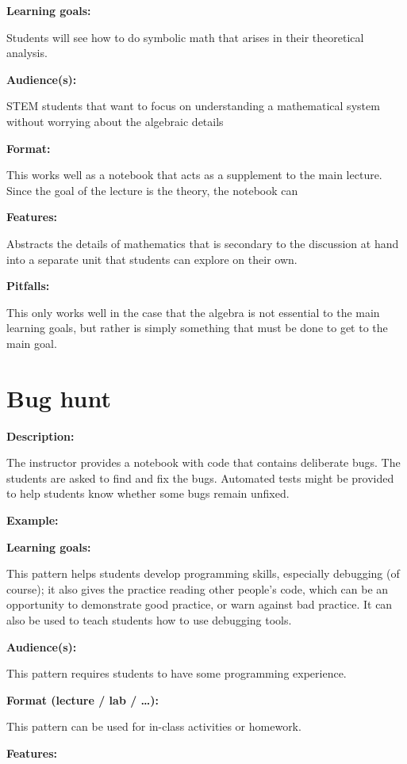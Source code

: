\documentclass[]{book}
\begin{document}
\textbf{Learning goals:}

Students will see how to do symbolic math that arises in their
theoretical analysis.

\textbf{Audience(s):}

STEM students that want to focus on understanding a mathematical system
without worrying about the algebraic details

\textbf{Format:}

This works well as a notebook that acts as a supplement to the main
lecture. Since the goal of the lecture is the theory, the notebook can

\textbf{Features:}

Abstracts the details of mathematics that is secondary to the discussion
at hand into a separate unit that students can explore on their own.

\textbf{Pitfalls:}

This only works well in the case that the algebra is not essential to
the main learning goals, but rather is simply something that must be
done to get to the main goal.

\section{Bug hunt}\label{bug-hunt}

\textbf{Description:}

The instructor provides a notebook with code that contains deliberate
bugs. The students are asked to find and fix the bugs. Automated tests
might be provided to help students know whether some bugs remain
unfixed.

\textbf{Example:}

\textbf{Learning goals:}

This pattern helps students develop programming skills, especially
debugging (of course); it also gives the practice reading other people's
code, which can be an opportunity to demonstrate good practice, or warn
against bad practice. It can also be used to teach students how to use
debugging tools.

\textbf{Audience(s):}

This pattern requires students to have some programming experience.

\textbf{Format (lecture / lab / \ldots{}):}

This pattern can be used for in-class activities or homework.

\textbf{Features:}
\end{document}
